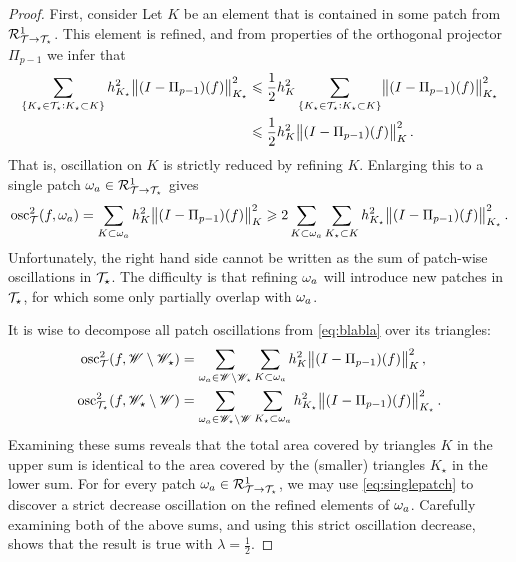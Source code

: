 \documentclass[thesis.tex]{subfiles}
\begin{document}
\begin{proof}
  First, consider
  Let $K$ be an element that is contained in some patch from  $\mathcal{R}^1_{\mathcal{T} \to \mathcal{T}_\star}$.
  This element is refined, and from properties of the orthogonal projector $\Pi_{p-1}$ we infer that
  \begin{equation}
    \label{eq:strictosc}
  \begin{aligned}
    \sum_{\set{K_\star \in \mathcal{T}_\star : K_\star \subset K}} h^2_{K_\star} \norm{(I - \Pi_{p-1})(f)}^2_{K_\star} &\leqslant \frac{1}{2}h^2_K \sum_{\set{K_\star \in \mathcal{T}_\star : K_\star \subset K}} \norm{(I - \Pi_{p-1})(f)}^2_{K_\star} \\
    &\leqslant \frac{1}{2} h^2_K \norm{(I - \Pi_{p-1})(f)}^2_K.
  \end{aligned}
  \end{equation}
  That is, oscillation on $K$ is strictly reduced by refining $K$.
  Enlarging this to a single patch $\omega_a \in \mathcal{R}^1_{\mathcal{T} \to \mathcal{T}_\star}$ gives
  \begin{equation}
    \label{eq:singlepatch}
    \operatorname{osc}_{\mathcal{T}}^2(f, \omega_a) = \sum_{K \subset \omega_a} h_K^2\norm{(I-\Pi_{p-1})(f)}_K^2 \geqslant 2 \sum_{K \subset \omega_a} \sum_{K_\star \subset K}h^2_{K_\star} \norm{(I-\Pi_{p-1})(f)}^2_{K_\star}.
  \end{equation}
  Unfortunately, the right hand side cannot be written as the sum of patch-wise oscillations in $\mathcal{T}_\star$.
  The difficulty is that refining $\omega_a$ will introduce new patches in $\mathcal{T}_\star$, for which 
  some only partially overlap with $\omega_a$. 
  
  It is wise to decompose all patch oscillations from \eqref{eq:blabla} over its triangles:
  \begin{align*}
    \operatorname{osc}_{\mathcal{T}}^2(f, \mathscr{W} \setminus \mathscr{W}_\star)  &= \sum_{\omega_a \in \mathscr{W} \setminus \mathscr{W}_\star} \sum_{K \subset \omega_a} h_{K}^2 \norm{(I-\Pi_{p-1})(f)}^2_{K}, \\
    \operatorname{osc}_{\mathcal{T}_\star}^2(f, \mathscr{W}_\star \setminus \mathscr{W})  &= \sum_{\omega_a \in \mathscr{W}_\star \setminus \mathscr{W}} \sum_{K_\star \subset \omega_a} h_{K_\star}^2 \norm{(I-\Pi_{p-1})(f)}^2_{K_\star}.
  \end{align*}
  Examining these sums reveals that the total area covered by triangles $K$ in the upper sum is identical to the area covered by the (smaller) triangles $K_\star$ in the
  lower sum. For for every patch $\omega_a \in \mathcal{R}^1_{\mathcal{T} \to \mathcal{T}_\star}$, we may use \eqref{eq:singlepatch} to discover a strict decrease oscillation on the refined elements of $\omega_a$.
  Carefully examining both of the above sums, and using this strict oscillation decrease, shows that the result is true with $\lambda = \frac{1}{2}$.
\end{proof}
\end{document}
